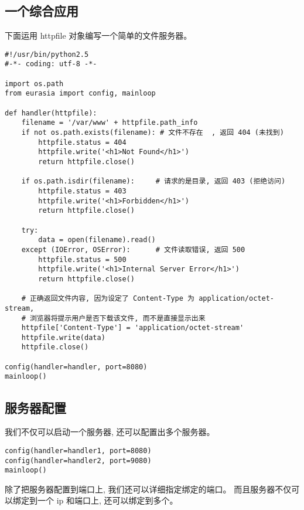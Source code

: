 \documentclass{manual}
\begin{document}

\subsection{一个综合应用}

下面运用 httpfile 对象编写一个简单的文件服务器。


\begin{verbatim}
#!/usr/bin/python2.5
#-*- coding: utf-8 -*-

import os.path
from eurasia import config, mainloop

def handler(httpfile):
	filename = '/var/www' + httpfile.path_info
	if not os.path.exists(filename): # 文件不存在  , 返回 404 (未找到)
		httpfile.status = 404
		httpfile.write('<h1>Not Found</h1>')
		return httpfile.close()

	if os.path.isdir(filename):     # 请求的是目录, 返回 403 (拒绝访问)
		httpfile.status = 403
		httpfile.write('<h1>Forbidden</h1>')
		return httpfile.close()

	try:
		data = open(filename).read()
	except (IOError, OSError):      # 文件读取错误, 返回 500
		httpfile.status = 500
		httpfile.write('<h1>Internal Server Error</h1>')
		return httpfile.close()

	# 正确返回文件内容, 因为设定了 Content-Type 为 application/octet-stream,
	# 浏览器将提示用户是否下载该文件, 而不是直接显示出来
	httpfile['Content-Type'] = 'application/octet-stream'
	httpfile.write(data)
	httpfile.close()

config(handler=handler, port=8080)
mainloop()
\end{verbatim}

\subsection{服务器配置}

我们不仅可以启动一个服务器, 还可以配置出多个服务器。

\begin{verbatim}
config(handler=handler1, port=8080)
config(handler=handler2, port=9080)
mainloop()
\end{verbatim}

除了把服务器配置到端口上, 我们还可以详细指定绑定的端口。
而且服务器不仅可以绑定到一个 ip 和端口上, 还可以绑定到多个。
\end{document}
